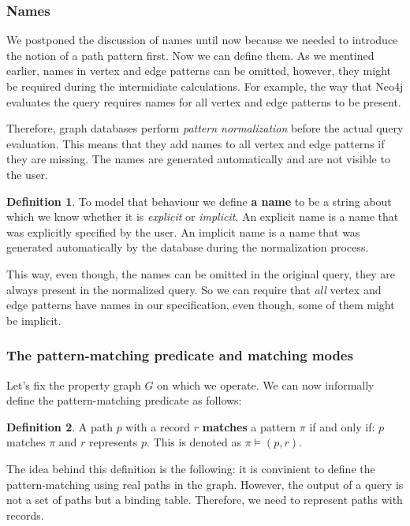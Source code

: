 \documentclass[14pt]{constructor-thesis}
\theoremstyle{definition}
\newtheorem*{definition}{Definition}
\begin{document}
\subsubsection{Names}

We postponed the discussion of names until now because we needed to introduce the notion of a path pattern first. Now we can define them. As we mentined earlier, names in vertex and edge patterns can be omitted, however, they might be required during the intermidiate calculations. For example, the way that Neo4j evaluates the query requires names for all vertex and edge patterns to be present. 

Therefore, graph databases perform \textit{pattern normalization} before the actual query evaluation. This means that they add names to all vertex and edge patterns if they are missing. The names are generated automatically and are not visible to the user.

\begin{definition}
  To model that behaviour we define \textbf{a name} to be a string about which we know whether it is \textit{explicit} or \textit{implicit}. An explicit name is a name that was explicitly specified by the user. An implicit name is a name that was generated automatically by the database during the normalization process.
\end{definition}

This way, even though, the names can be omitted in the original query, they are always present in the normalized query. So we can require that \textit{all} vertex and edge patterns have names in our specification, even though, some of them might be implicit.

\subsubsection{The pattern-matching predicate and matching modes}

Let's fix the property graph $G$ on which we operate. We can now informally define the pattern-matching predicate as follows:

\begin{definition}
   A path $p$ with a record $r$ \textbf{matches} a pattern $\pi$ if and only if: $p$ matches $\pi$ and $r$ represents $p$. This is denoted as $\pi \models (p, r)$.
\end{definition}

The idea behind this definition is the following: it is convinient to define the pattern-matching using real paths in the graph. However, the output of a query is not a set of paths but a binding table. Therefore, we need to represent paths with records.
\end{document}
